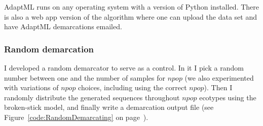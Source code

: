 AdaptML runs on any operating system with a  version of Python installed. There is also a web app version of the algorithm where one can upload the data set and have AdaptML demarcations emailed.

\subsubsection*{Random demarcation}
I developed a random demarcator to serve as a control.
In it I pick a random number between one and the number of samples for $npop$ (we also experimented with variations of $npop$ choices, including using the correct $npop$). 
Then I randomly distribute the generated sequences throughout $npop$ ecotypes using the broken-stick model, and finally write a demarcation output file (see Figure~\ref{code:RandomDemarcating} on page~\pageref{code:RandomDemarcating}).


